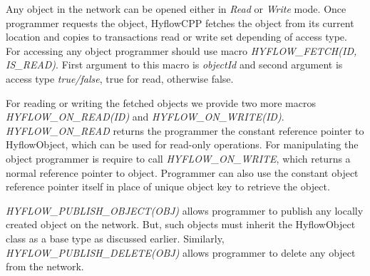 \documentclass[12pt,english]{report}
\begin{document}
Any object in the network can be opened either in \emph{Read} or \emph{Write} mode. Once programmer requests the object, HyflowCPP fetches the object from its current location and copies to transactions read or write set depending of access type. For accessing any object programmer should use macro \emph{HYFLOW{\_}FETCH(ID, IS{\_}READ)}. First argument to this macro is \emph{objectId} and second argument is access type \emph{true/false}, true for read, otherwise false.

For reading or writing the fetched objects we provide two more macros \emph{HYFLOW{\_}ON{\_}READ(ID)} and \emph{HYFLOW{\_}ON{\_}WRITE(ID)}. \emph{HYFLOW{\_}ON{\_}READ} returns the programmer the constant reference pointer to HyflowObject, which can be used for read-only operations. For manipulating the object programmer is require to call \emph{HYFLOW{\_}ON{\_}WRITE}, which returns a normal reference pointer to object. Programmer can also use the constant object reference pointer itself in place of unique object key to retrieve the object.   

\emph{HYFLOW{\_}PUBLISH{\_}OBJECT(OBJ)} allows programmer to publish any locally created object on the network. But, such objects must inherit the HyflowObject class as a base type as discussed earlier. Similarly, \emph{HYFLOW{\_}PUBLISH{\_}DELETE(OBJ)} allows programmer to delete any object from the network.
\end{document}
